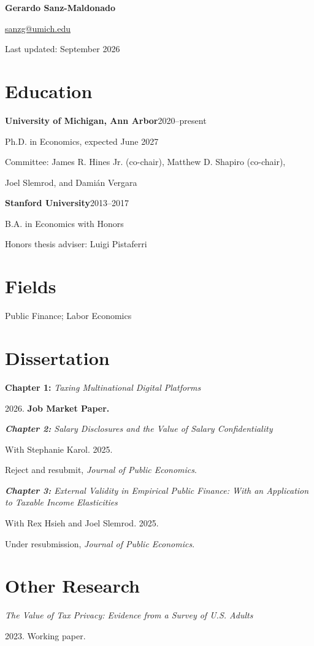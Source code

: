 \documentclass[11pt,letterpaper]{article}
\newcommand{\entry}[2]{\textbf{#1}\hfill #2\par}
\newcommand{\gap}{\vspace{6pt}}
\newcommand{\paper}[3]{\textit{#1}\par #2\par #3\par\vspace{7pt}}
\begin{document}
\begin{center}
  {\LARGE\bfseries Gerardo Sanz-Maldonado}\par
  \vspace{4pt}
  \href{mailto:sanzg@umich.edu}{sanzg@umich.edu}\par
  \vspace{3pt}
  {\small Last updated: September 2026}
\end{center}
\vspace{-7pt}

\section{Education}
\entry{University of Michigan, Ann Arbor}{2020--present}
Ph.D. in Economics, expected June 2027\par
Committee: James R. Hines Jr. (co-chair), Matthew D. Shapiro (co-chair),\par
\hspace*{3.2em}Joel Slemrod, and Dami\'an Vergara
\gap

\entry{Stanford University}{2013--2017}
B.A. in Economics with Honors\par
Honors thesis adviser: Luigi Pistaferri

\section{Fields}
Public Finance; Labor Economics

\section{Dissertation}
\textbf{Chapter 1:} \textit{Taxing Multinational Digital Platforms}\par
2026. \textbf{Job Market Paper.}
\vspace{9pt}

\paper{\textnormal{\textbf{Chapter 2:}} Salary Disclosures and the Value of Salary Confidentiality}
  {With Stephanie Karol. 2025.}
  {Reject and resubmit, \textit{Journal of Public Economics}.}
\paper{\textnormal{\textbf{Chapter 3:}} External Validity in Empirical Public Finance: With an Application to Taxable Income Elasticities}
  {With Rex Hsieh and Joel Slemrod. 2025.}
  {Under resubmission, \textit{Journal of Public Economics}.}

\section{Other Research}
\textit{The Value of Tax Privacy: Evidence from a Survey of U.S. Adults}\par
2023. Working paper.
\vspace{9pt}
\end{document}
